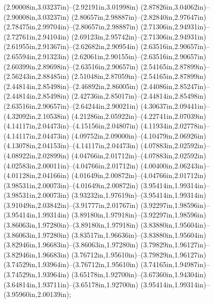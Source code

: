 (2.90008in,3.03237in)--(2.92191in,3.01998in) (2.87826in,3.04062in)--(2.90008in,3.03237in) (2.80657in,2.98887in)--(2.82840in,2.97647in) (2.78475in,2.99704in)--(2.80657in,2.98887in) (2.71306in,2.94931in)--(2.72761in,2.94104in) (2.69123in,2.95742in)--(2.71306in,2.94931in) (2.61955in,2.91367in)--(2.62682in,2.90954in) (2.63516in,2.90657in)--(2.65594in,2.91323in) (2.62061in,2.90155in)--(2.63516in,2.90657in) (2.60399in,2.89698in)--(2.63516in,2.90657in) (2.54165in,2.87899in)--(2.56243in,2.88485in) (2.51048in,2.87059in)--(2.54165in,2.87899in) (2.44814in,2.85498in)--(2.46892in,2.86005in) (2.44086in,2.85247in)--(2.44814in,2.85498in) (2.42736in,2.85017in)--(2.44814in,2.85498in) (2.63516in,2.90657in)--(2.64244in,2.90021in) (4.30637in,2.09441in)--(4.32092in,2.10538in) (4.21286in,2.05922in)--(4.22741in,2.07039in) (4.14117in,2.04473in)--(4.15156in,2.04807in) (4.11934in,2.02778in)--(4.14117in,2.04473in) (4.09752in,2.09000in)--(4.10479in,2.06926in) (4.13078in,2.04153in)--(4.14117in,2.04473in) (4.07883in,2.02592in)--(4.08922in,2.02899in) (4.04766in,2.01712in)--(4.07883in,2.02592in) (4.02583in,2.00011in)--(4.04766in,2.01712in) (4.00400in,2.06243in)--(4.01128in,2.04166in) (4.01649in,2.00872in)--(4.04766in,2.01712in) (3.98531in,2.00073in)--(4.01649in,2.00872in) (3.95414in,1.99314in)--(3.98531in,2.00073in) (3.93232in,1.97619in)--(3.95414in,1.99314in) (3.91049in,2.03842in)--(3.91777in,2.01767in) (3.92297in,1.98596in)--(3.95414in,1.99314in) (3.89180in,1.97918in)--(3.92297in,1.98596in) (3.86063in,1.97280in)--(3.89180in,1.97918in) (3.83880in,1.95604in)--(3.86063in,1.97280in) (3.83517in,1.96636in)--(3.83880in,1.95604in) (3.82946in,1.96683in)--(3.86063in,1.97280in) (3.79829in,1.96127in)--(3.82946in,1.96683in) (3.76712in,1.95610in)--(3.79829in,1.96127in) (3.74529in,1.93964in)--(3.76712in,1.95610in) (3.74165in,1.94987in)--(3.74529in,1.93964in) (3.65178in,1.92700in)--(3.67360in,1.94304in) (3.64814in,1.93711in)--(3.65178in,1.92700in) (3.95414in,1.99314in)--(3.95960in,2.00139in);
